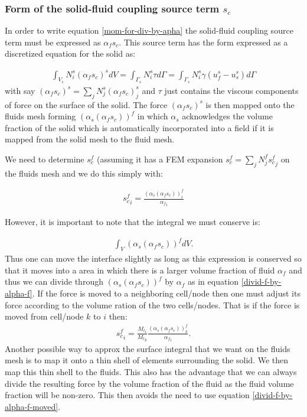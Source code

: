 \subsubsection{Form of the solid-fluid coupling source term $s_c$}
In order to write equation \ref{mom-for-div-by-apha} 
the solid-fluid coupling source term must be expressed 
as $\alpha_f s_c$. 
This source term has the form expressed as a discretized equation 
for the solid as: 

\begin{eqnarray}
\int_{V_s} N_i^s (\alpha_f s_c)^s dV= \int_{\Gamma_s} N_i^s \tau d\Gamma = \int_{\Gamma_s} N_i^s \gamma (u^s_f - u^s_s) d\Gamma
\end{eqnarray}
with say $(\alpha_f s_c)^s=\sum_j N_j^s (\alpha_f s_c)^s_j$ 
and $\tau$ just contains the viscous components of force 
on the surface of the solid. The force $(\alpha_f s_c)^s$ is 
then mapped onto the fluids mesh forming $(\alpha_s(\alpha_f s_c))^f$ 
in which $\alpha_s$ acknowledges the volume fraction of the 
solid which is automatically incorporated into 
a field if it is mapped from the solid mesh 
to the fluid mesh. 

We need to determine $s_c^f$ (assuming it has a FEM expansion 
$s_c^f=\sum_j N_j^f {s_c^f}_j$ on the fluids mesh and we 
do this simply with: 

\begin{eqnarray}
{s_c^f}_i= \frac{(\alpha_s(\alpha_f s_c))^f_i}{{\alpha_f}_i}
\label{divid-f-by-alpha-f}
\end{eqnarray}

However, it is important to note that the integral we 
must conserve is: 

\begin{eqnarray}
\int_V (\alpha_s(\alpha_f s_c))^f dV.
\end{eqnarray}
Thus one can move the interface slightly as long as this expression 
is conserved so that it moves into a area in which there is a 
larger volume fraction of fluid $\alpha_f$ and thus we 
can divide through $(\alpha_s(\alpha_f s_c))^f$ by $\alpha_f$ as in equation 
\ref{divid-f-by-alpha-f}. If the force is moved to a neighboring cell/node 
then one must adjust its force according to the volume ration 
of the two cells/nodes. That is if the force is moved 
from cell/node $k$ to $i$ then: 
\begin{eqnarray}
{s_c^f}_i= \frac{{M_l}_i}{{M_l}_k} \frac{(\alpha_s(\alpha_f s_c))^f_k}{{\alpha_f}_i}. 
\label{divid-f-by-alpha-f-moved}
\end{eqnarray}
Another possible way to approx the surface integral that we want on the 
fluids mesh is to map it onto a thin shell of elements surrounding the solid. 
We then map this thin shell to the fluids. 
This also has the advantage that we can always divide the resulting force by the 
volume fraction of the fluid as the fluid volume fraction will be non-zero. 
This then avoids the need to use equation \ref{divid-f-by-alpha-f-moved}. 


